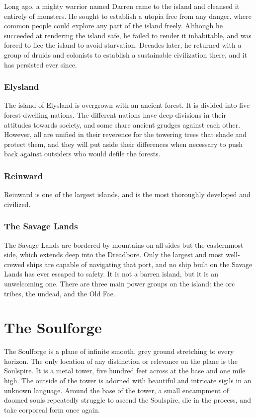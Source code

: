             Long ago, a mighty warrior named Darren came to the island and cleansed it entirely of monsters.
            He sought to establish a utopia free from any danger, where common people could explore any part of the island freely.
            Although he succeeded at rendering the island safe, he failed to render it inhabitable, and was forced to flee the island to avoid starvation.
            Decades later, he returned with a group of druids and colonists to establish a sustainable civilization there, and it has persisted ever since.
            
        \subsubsection{Elysland}
            The island of Elysland is overgrown with an ancient forest.
            It is divided into five forest-dwelling nations.
            The different nations have deep divisions in their attitudes towards society, and some share ancient grudges against each other.
            However, all are unified in their reverence for the towering trees that shade and protect them, and they will put aside their differences when necessary to push back against outsiders who would defile the forests.

        \subsubsection{Reinward}
            Reinward is one of the largest islands, and is the most thoroughly developed and civilized.

        \subsubsection{The Savage Lands}
            The Savage Lands are bordered by mountains on all sides but the easternmost side, which extends deep into the Dreadbore.
            Only the largest and most well-crewed ships are capable of navigating that port, and no ship built on the Savage Lands has ever escaped to safety.
            It is not a barren island, but it is an unwelcoming one.
            There are three main power groups on the island: the orc tribes, the undead, and the Old Fae.

\section{The Soulforge}
    The Soulforge is a plane of infinite smooth, grey ground stretching to every horizon.
    The only location of any distinction or relevance on the plane is the Soulspire.
    It is a metal tower, five hundred feet across at the base and one mile high.
    The outside of the tower is adorned with beautiful and intricate sigils in an unknown language.
    Around the base of the tower, a small encampment of doomed souls repeatedly struggle to ascend the Soulspire, die in the process, and take corporeal form once again.

